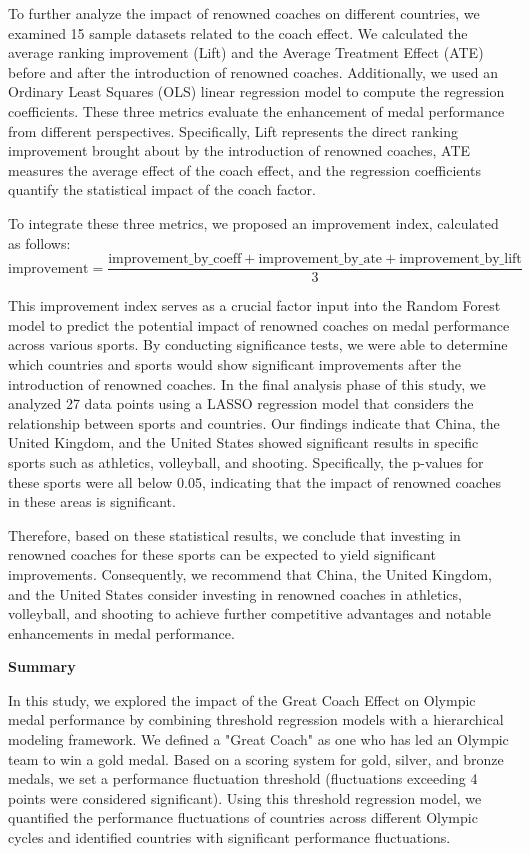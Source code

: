 \documentclass[12pt]{article}
\begin{document}
To further analyze the impact of renowned coaches on different countries, we examined 15 sample datasets related to the coach effect. We calculated the average ranking improvement (Lift) and the Average Treatment Effect (ATE) before and after the introduction of renowned coaches. Additionally, we used an Ordinary Least Squares (OLS) linear regression model to compute the regression coefficients. These three metrics evaluate the enhancement of medal performance from different perspectives. Specifically, Lift represents the direct ranking improvement brought about by the introduction of renowned coaches, ATE measures the average effect of the coach effect, and the regression coefficients quantify the statistical impact of the coach factor.

To integrate these three metrics, we proposed an improvement index, calculated as follows:
$$
\text{improvement} = \frac{\text{improvement\_by\_coeff} + \text{improvement\_by\_ate} + \text{improvement\_by\_lift}}{3}
$$

This improvement index serves as a crucial factor input into the Random Forest model to predict the potential impact of renowned coaches on medal performance across various sports. By conducting significance tests, we were able to determine which countries and sports would show significant improvements after the introduction of renowned coaches. In the final analysis phase of this study, we analyzed 27 data points using a LASSO regression model that considers the relationship between sports and countries. Our findings indicate that China, the United Kingdom, and the United States showed significant results in specific sports such as athletics, volleyball, and shooting. Specifically, the p-values for these sports were all below 0.05, indicating that the impact of renowned coaches in these areas is significant.

Therefore, based on these statistical results, we conclude that investing in renowned coaches for these sports can be expected to yield significant improvements. Consequently, we recommend that China, the United Kingdom, and the United States consider investing in renowned coaches in athletics, volleyball, and shooting to achieve further competitive advantages and notable enhancements in medal performance.

\noindent \textbf{Summary}

In this study, we explored the impact of the Great Coach Effect on Olympic medal performance by combining threshold regression models with a hierarchical modeling framework. We defined a "Great Coach" as one who has led an Olympic team to win a gold medal. Based on a scoring system for gold, silver, and bronze medals, we set a performance fluctuation threshold (fluctuations exceeding 4 points were considered significant). Using this threshold regression model, we quantified the performance fluctuations of countries across different Olympic cycles and identified countries with significant performance fluctuations.
\end{document}
